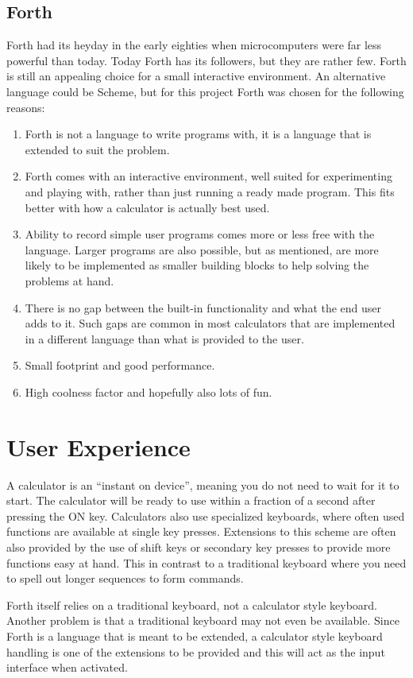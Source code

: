 \documentclass[a4paper]{article}
\begin{document}
\subsection{Forth}
Forth had its heyday in the early eighties when microcomputers were far less powerful than today.
Today Forth has its followers, but they are rather few. Forth is still an appealing choice for a small interactive environment. An alternative language could be Scheme, but for this project Forth was chosen for the following reasons:
\begin{enumerate}
\item Forth is not a language to write programs with, it is a language that is extended to suit the problem.
\item Forth comes with an interactive environment, well suited for experimenting and playing with, rather than just running a ready made program.  This fits better with how a calculator is actually best used.
\item Ability to record simple user programs comes more or less free with the language. Larger programs are also possible, but as mentioned, are more likely to be implemented as smaller building blocks to help solving the problems at hand.
\item There is no gap between the built-in functionality and what the end user adds to it. Such gaps are common in most calculators that are implemented in a different language than what is provided to the user.
\item Small footprint and good performance.
\item High coolness factor and hopefully also lots of fun.
\end{enumerate}

\section{User Experience}
A calculator is an ``instant on device'', meaning you do not need to wait for it to start. The calculator will be ready to use within a fraction of a second after pressing the ON key. Calculators also use specialized keyboards, where often used functions are available at single key presses. Extensions to this scheme are often also provided by the use of shift keys or secondary key presses to provide more functions easy at hand. This in contrast to a traditional keyboard where you need to spell out longer sequences to form commands.

Forth itself relies on a traditional keyboard, not a calculator style keyboard. Another problem is that a traditional keyboard may not even be available. Since Forth is a language that is meant to be extended, a calculator style keyboard handling is one of the extensions to be provided and this will act as the input interface when activated.
\end{document}
